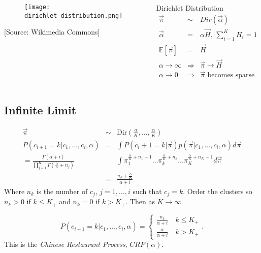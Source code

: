 \documentclass{beamer}
\begin{document}
\begin{frame}
\begin{columns}[top]
\begin{center}
		\begin{figure}
		\texttt{[image: dirichlet\_distribution.png]}
	\end{figure}
	\tiny{[Source: Wikimedia Commons]}
\end{center}
\begin{block}{Dirichlet Distribution}
\begin{eqnarray*}
\vec{\pi}  & \sim & Dir(\vec{\alpha}) \\
\vec{\alpha} & = & \alpha\vec{H},\,\displaystyle\sum_{i=1}^{K} H_i = 1 \\
\mathbb{E}[\vec{\pi}] & = & \vec{H} \\
\alpha\rightarrow\infty & \Rightarrow & \vec{\pi}\rightarrow\vec{H} \\
\alpha\rightarrow 0 & \Rightarrow & \vec{\pi} \text{ becomes sparse}
\end{eqnarray*}
\end{block}
\end{columns}
\end{frame}

\subsection{Infinite Limit}
\begin{frame}
\begin{eqnarray*}
\vec{\pi} & \sim & \text{Dir}\left(\frac{\alpha}{K},\ldots,\frac{\alpha}{K}\right) \\
P(c_{i+1} = k|c_1,\ldots,c_{i},\alpha) & = & \int P(c_i+1 = k | \vec{\pi}) p(\vec{\pi}|c_1,\ldots,c_{i},\alpha) d\vec{\pi} \\
= \frac{\Gamma(\alpha + i )}{\prod_{j=1}^{K}\Gamma(\frac{\alpha}{K} + n_j)} &&\int\pi_1^{\frac{\alpha}{K}+n_1 -1}\ldots\pi_k^{\frac{\alpha}{K}+n_k}\ldots\pi_K^{\frac{\alpha}{K}+n_K-1}d\vec{\pi} \\
& = & \frac{n_k + \frac{\alpha}{K}}{\alpha + i}
\end{eqnarray*}
Where $n_k$ is the number of $c_j$, $j = 1,\ldots,i$ such that $c_j = k$.   Order the clusters so $n_k > 0$ if $k \le K_+$ and $n_k = 0$ if $k > K_+$.  Then as $K\rightarrow\infty$

\begin{equation*}
P(c_{i+1} = k | c_1,\ldots,c_{i},\alpha) = 
\left\{ \begin{array}{l} 
       \frac{n_k}{\alpha+i} \quad k \leq K_+\\ 
	\frac{\alpha}{\alpha+i} \quad k>K_+ \end{array} \right..
\label{eqn:crp}
\end{equation*}
This is the {\em Chinese Restaurant Process}, $CRP(\alpha)$.
\end{frame}
\end{document}
